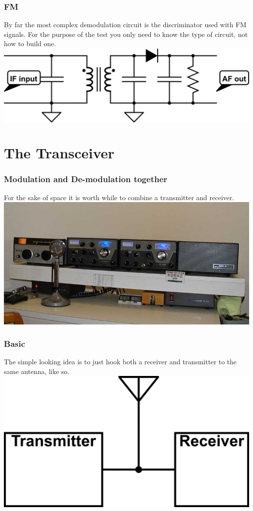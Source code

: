 \documentclass[10pt, handout]{beamer}
\begin{document}
\begin{frame}
\frametitle{FM}
By far the most complex demodulation circuit is the discriminator used with FM signals. For the purpose of the test you only need to know the type of circuit, not how to build one. 
\includegraphics[width=.9\textwidth]{simplediscriminator.png}
\end{frame}

\section{The Transceiver}

\begin{frame}
\frametitle{Modulation and De-modulation together}
For the sake of space it is worth while to combine a transmitter and receiver.
\includegraphics[height=.6\textheight]{drake4.jpg}
\end{frame}

\begin{frame}
\frametitle{Basic}
The simple looking idea is to just hook both a receiver and transmitter to the same antenna, like so.
\includegraphics[height=.5\textheight]{simpletr.png}
\end{frame}
\end{document}
